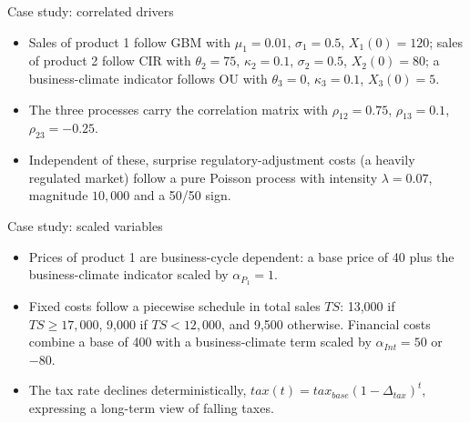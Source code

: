 \documentclass[aspectratio=169,11pt]{beamer}
\begin{document}
\begin{frame}{Case study: correlated drivers}
  \begin{itemize}
    \item Sales of product 1 follow GBM with $\mu_1=0.01$, $\sigma_1=0.5$,
          $X_1(0)=120$; sales of product 2 follow CIR with $\theta_2=75$,
          $\kappa_2=0.1$, $\sigma_2=0.5$, $X_2(0)=80$; a business-climate
          indicator follows OU with $\theta_3=0$, $\kappa_3=0.1$,
          $X_3(0)=5$.
    \item The three processes carry the correlation matrix with
          $\rho_{12}=0.75$, $\rho_{13}=0.1$, $\rho_{23}=-0.25$.
    \item Independent of these, surprise regulatory-adjustment costs (a
          heavily regulated market) follow a pure Poisson process with
          intensity $\lambda=0.07$, magnitude $10{,}000$ and a 50/50 sign.
  \end{itemize}
\end{frame}

\begin{frame}{Case study: scaled variables}
  \begin{itemize}
    \item Prices of product 1 are business-cycle dependent: a base price of
          40 plus the business-climate indicator scaled by
          $\alpha_{P_1}=1$.
    \item Fixed costs follow a piecewise schedule in total sales $TS$:
          13{,}000 if $TS \ge 17{,}000$, 9{,}000 if $TS < 12{,}000$, and
          9{,}500 otherwise. Financial costs combine a base of 400 with a
          business-climate term scaled by $\alpha_{Int}=50$ or $-80$.
    \item The tax rate declines deterministically,
          $tax(t) = tax_{base}(1-\Delta_{tax})^{t}$, expressing a long-term
          view of falling taxes.
  \end{itemize}
\end{frame}
\end{document}
